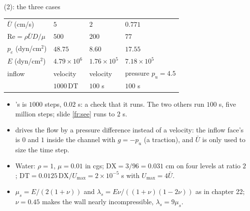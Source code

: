 \documentclass[aspectratio=169,11pt]{beamer}
\begin{document}
\begin{frame}{ (2): the three cases}
\label{fr:cases}
\footnotesize
\begin{center}
\begin{tabular}{@{}L{0.22\textwidth}lll@{}}
\toprule
&  &  &  \\
\midrule
$\bar U$ (cm/s) & $5$ & $2$ & $0.771$ \\
$\mathrm{Re} = \rho\bar U D/\mu$ & $500$ & $200$ & $77$ \\
$p_e$ (dyn/cm$^2$) & $48.75$ & $8.60$ & $17.55$ \\
$E$ (dyn/cm$^2$) & $4.79\times10^6$ & $1.76\times10^5$ & $7.18\times10^5$ \\
inflow & velocity & velocity & pressure $p_u = 4.5$ \\
 & $1000\,\mathrm{DT}$ & $100$ s & $100$ s \\
\bottomrule
\end{tabular}
\end{center}
\begin{itemize}
  \item {}'s  is $1000$ steps, $0.02$ s: a check that it runs. The two others run $100$ s, five million steps; slide \ref{fr:see} runs  to $2$ s.
  \item {} drives the flow by a pressure difference instead of a velocity: the inflow face's  is $0$ and  $1$ inside the channel with $g = -p_u$ (a traction), and $\bar U$ is only used to size the time step.
  \item Water: $\rho = 1$, $\mu = 0.01$ in cgs; $\mathrm{DX} = 3/96 = 0.031$ cm on four levels at ratio $2$; $\mathrm{DT} = 0.0125\,\mathrm{DX}/U_{\max} = 2\times10^{-5}$ s with $U_{\max} = 4\bar U$.
  \item $\mu_s = E/(2(1+\nu))$ and $\lambda_s = E\nu/((1+\nu)(1-2\nu))$ as in chapter 22; $\nu = 0.45$ makes the wall nearly incompressible, $\lambda_s = 9\mu_s$.
\end{itemize}
\end{frame}
\end{document}
